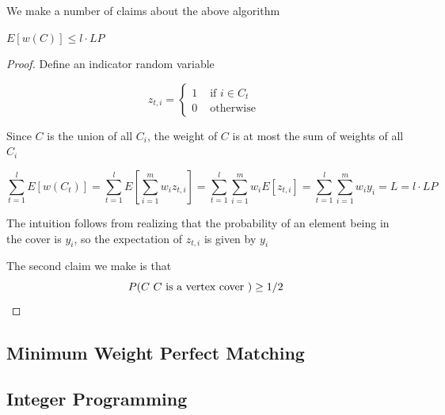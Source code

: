 \documentclass[../notes.tex]{subfiles}
\begin{document}
We make a number of claims about the above algorithm

\begin{lemma}
$ E[w(C)] \le  l \cdot  LP $
\end{lemma}



\begin{proof}
    Define an indicator random variable

    \begin{equation}
        z_{t, i} = \begin{cases}
            1 & \text{ if } i \in C_t \\
            0 & \text{ otherwise }
        \end{cases}
    \end{equation}

    Since $ C $ is the union of all $ C_i $, the weight of $ C $ is at most the sum of weights of all $ C_i $

    \begin{equation}
        \sum^l_{t=1} E[w(C_t)] = \sum^l_{t=1} E[\sum_{i = 1}^m w_i z_{t,i}] = \sum^l_{t=1} \sum_{i = 1}^m w_i E[z_{t,i}] = \sum^l_{t=1} \sum_{i=1}^m w_i y_i = L = l \cdot  LP
    \end{equation}

    The intuition follows from realizing that the probability of an element being in the cover is $ y_i $, so the expectation of $ z_{t,i} $ is given by $ y_i $


    The second claim we make is that
    \begin{equation}
        P(C \text{ $ C $ is a vertex cover }) \ge  1/2
    \end{equation}
\end{proof}











\subsection{Minimum Weight Perfect Matching}

\subsection{Integer Programming}
\end{document}
